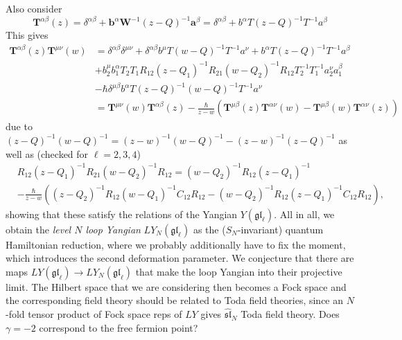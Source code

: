 \documentclass[11pt]{report}
\theoremstyle{definition}
\theoremstyle{remark}
\theoremstyle{remark}
\begin{document}
Also consider
\begin{equation*}
\mathbf{T}^{\alpha\beta}(z) = \delta^{\alpha\beta} + \mathbf{b}^\alpha \mathbf{W}^{-1} (z-Q)^{-1} \mathbf{a}^\beta = \delta^{\alpha\beta} + b^\alpha T (z-Q)^{-1} T^{-1}a^\beta
\end{equation*}
This gives
\begin{align*}
\mathbf{T}^{\alpha\beta}(z) \mathbf{T}^{\mu\nu}(w)
&= \delta^{\alpha\beta} \delta^{\mu\nu} + \delta^{\alpha\beta} b^\mu T (w-Q)^{-1} T^{-1} a^\nu + b^\alpha T (z-Q)^{-1} T^{-1} a^\beta \\
&+ b_2^\mu b_1^\alpha T_2 T_1 R_{12} (z-Q_1)^{-1} R_{21} (w-Q_2)^{-1} R_{12} T_2^{-1} T_1^{-1} a_2^\nu a_1^\beta \\
&- \hbar \delta^{\mu\beta} b^\alpha T (z-Q)^{-1} (w-Q)^{-1} T^{-1} a^\nu \\
&= \mathbf{T}^{\mu\nu}(w) \mathbf{T}^{\alpha\beta}(z) - \frac{\hbar}{z-w} (\mathbf{T}^{\mu\beta}(z) \mathbf{T}^{\alpha\nu}(w) - \mathbf{T}^{\mu\beta}(w) \mathbf{T}^{\alpha\nu}(z))
\end{align*}
due to $(z-Q)^{-1} (w-Q)^{-1} = (z-w)^{-1} (w-Q)^{-1} - (z-w)^{-1} (z-Q)^{-1}$ as well as (checked for $\ell=2,3,4$)
\begin{align*}
&R_{12} (z-Q_1)^{-1} R_{21} (w-Q_2)^{-1} R_{12}
= (w-Q_2)^{-1} R_{12} (z-Q_1)^{-1} \\
&- \frac{\hbar}{z-w} ((z-Q_2)^{-1} R_{12} (w-Q_1)^{-1} C_{12} R_{12} - (w-Q_2)^{-1} R_{12} (z-Q_1)^{-1} C_{12} R_{12}),
\end{align*}
showing that these satisfy the relations of the Yangian $Y(\mathfrak{gl}_\ell)$. All in all, we obtain the \emph{level $N$ loop Yangian} $LY_N(\mathfrak{gl}_\ell)$ as the ($S_N$-invariant) quantum Hamiltonian reduction, where we probably additionally have to fix the moment, which introduces the second deformation parameter. We conjecture that there are maps $LY(\mathfrak{gl}_\ell) \to LY_N(\mathfrak{gl}_\ell)$ that make the loop Yangian into their projective limit. The Hilbert space that we are considering then becomes a Fock space and the corresponding field theory should be related to Toda field theories, since an $N$-fold tensor product of Fock space reps of $LY$ gives $\widehat{\mathfrak{sl}}_N$ Toda field theory. Does $\gamma = -2$ correspond to the free fermion point?
\end{document}
